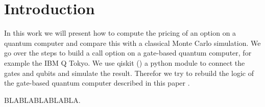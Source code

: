 \section{Introduction}
In this work we will present how to compute the pricing of an option on a quantum computer and compare this with a classical Monte Carlo simulation.
We go over the steps to build a call option on a gate-based quantum computer, for example the IBM Q Tokyo. We use qiskit (\cite{Qiskit}) a python module to connect the gates and qubits and simulate the result.
Therefor we try to rebuild the logic of the gate-based quantum computer described in this paper \cite{1905.02666}.

BLABLABLABLABLA.
